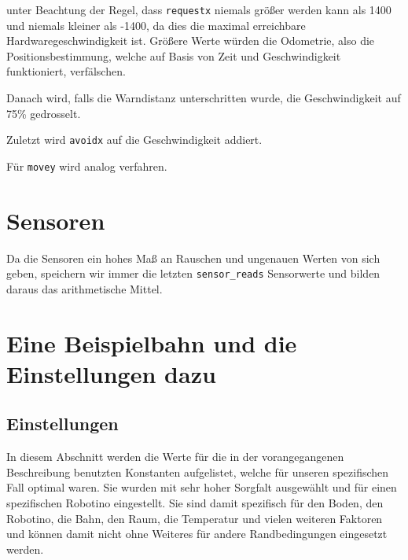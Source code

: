 unter Beachtung der Regel, dass \verb|requestx| niemals größer werden kann als
1400 und niemals kleiner als -1400, da dies die maximal erreichbare
Hardwaregeschwindigkeit ist. Größere Werte würden die Odometrie, also die
Positionsbestimmung, welche auf Basis von Zeit und Geschwindigkeit
funktioniert, verfälschen.

Danach wird, falls die Warndistanz unterschritten wurde, die Geschwindigkeit
auf 75\% gedrosselt.

Zuletzt wird \verb|avoidx| auf die Geschwindigkeit addiert.

Für \verb|movey| wird analog verfahren.


\section{Sensoren}

Da die Sensoren ein hohes Maß an Rauschen und ungenauen Werten von sich geben,
speichern wir immer die letzten \verb|sensor_reads| Sensorwerte und bilden
daraus das arithmetische Mittel.


\section{Eine Beispielbahn und die Einstellungen dazu}

\subsection{Einstellungen}

In diesem Abschnitt werden die Werte für die in der vorangegangenen
Beschreibung benutzten Konstanten aufgelistet, welche für unseren spezifischen
Fall optimal waren. Sie wurden mit sehr hoher Sorgfalt ausgewählt und für einen
spezifischen Robotino eingestellt. Sie sind damit spezifisch für den Boden, den
Robotino, die Bahn, den Raum, die Temperatur und vielen weiteren Faktoren und
können damit nicht ohne Weiteres für andere Randbedingungen eingesetzt werden.

